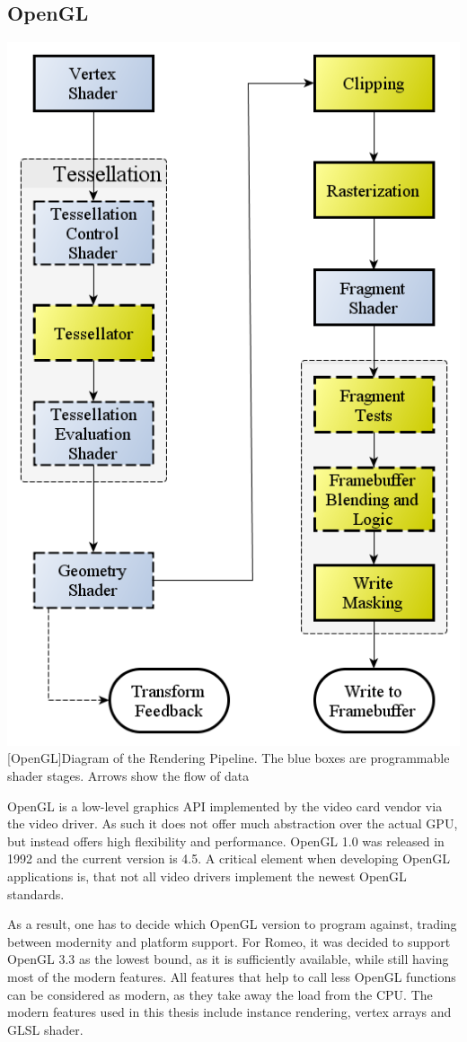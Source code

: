 \subsection{\ac{OpenGL}}

\vspace{1em}
\begin{minipage}{\linewidth}
    \centering
    \includegraphics[width=0.5\linewidth]{graphics/RenderingPipeline.png}
    [OpenGL]{Diagram of the Rendering Pipeline. The blue boxes are programmable shader stages. Arrows show the flow of data\cite{OpenGLPipeline}}
    \label{fig:opengl}
\end{minipage}


\ac{OpenGL} is a low-level graphics API implemented by the video card vendor via the video driver. 
As such it does not offer much abstraction over the actual \ac{GPU}, but instead offers high flexibility and performance.
\ac{OpenGL} 1.0 was released in 1992 and the current version is 4.5.
A critical element when developing \ac{OpenGL} applications is, that not all video drivers implement the newest \ac{OpenGL} standards.

As a result, one has to decide which \ac{OpenGL} version to program against, trading between modernity and platform support.
For Romeo, it was decided to support \ac{OpenGL} 3.3 as the lowest bound, as it is sufficiently available, while still having most of the modern features. 
All features that help to call less OpenGL functions can be considered as modern, as they take away the load from the CPU.
The modern features used in this thesis include instance rendering, vertex arrays and \ac{GLSL} shader.

